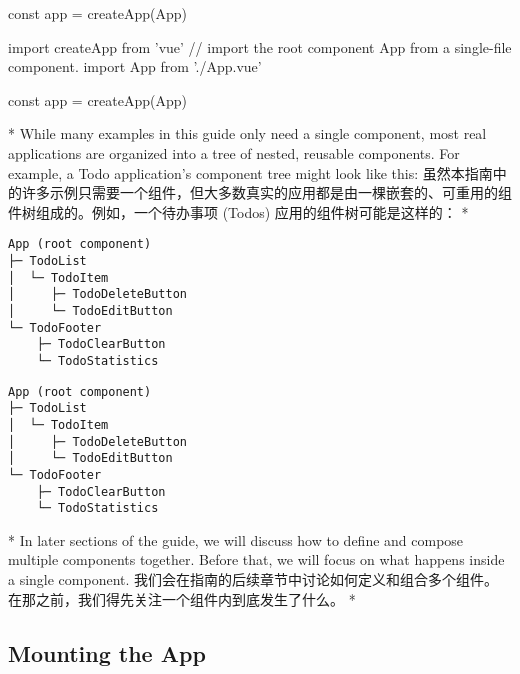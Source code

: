 \begin{paracol}{2}
\begin{codeJs}
const app = createApp(App)
\end{codeJs}
\switchcolumn
\begin{codeJs}
import { createApp } from 'vue'
// import the root component App from a single-file component.
import App from './App.vue'

const app = createApp(App)
\end{codeJs}
\switchcolumn[0]*%
While many examples in this guide only need a single component, most
real applications are organized into a tree of nested, reusable
components. For example, a Todo application's component tree might look
like this:
\switchcolumn
虽然本指南中的许多示例只需要一个组件，但大多数真实的应用都是由一棵嵌套的、可重用的组件树组成的。例如，一个待办事项
(Todos) 应用的组件树可能是这样的：
\switchcolumn[0]*%
\begin{verbatim}
App (root component)
├─ TodoList
│  └─ TodoItem
│     ├─ TodoDeleteButton
│     └─ TodoEditButton
└─ TodoFooter
    ├─ TodoClearButton
    └─ TodoStatistics
\end{verbatim}
\switchcolumn
\begin{verbatim}
App (root component)
├─ TodoList
│  └─ TodoItem
│     ├─ TodoDeleteButton
│     └─ TodoEditButton
└─ TodoFooter
    ├─ TodoClearButton
    └─ TodoStatistics
\end{verbatim}
\switchcolumn[0]*%
In later sections of the guide, we will discuss how to define and
compose multiple components together. Before that, we will focus on what
happens inside a single component.
\switchcolumn
我们会在指南的后续章节中讨论如何定义和组合多个组件。在那之前，我们得先关注一个组件内到底发生了什么。
\switchcolumn[0]*%
\subsection{Mounting the App}
\switchcolumn

\end{paracol}
